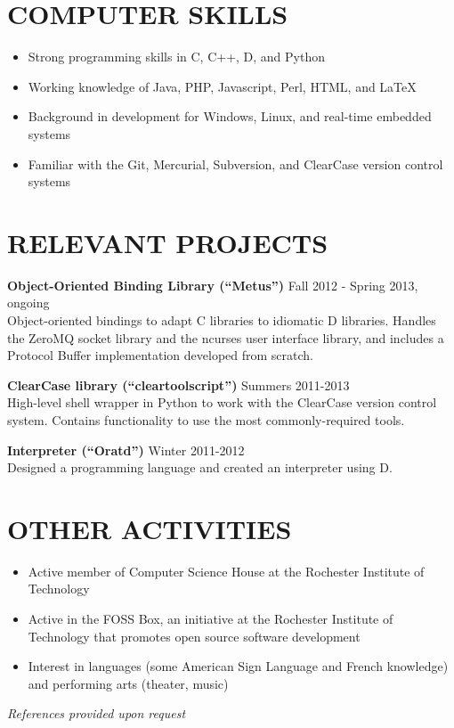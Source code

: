 \documentclass[line]{res}
\begin{document}
\begin{resume}
\section{COMPUTER SKILLS}

	\begin{itemize}[leftmargin=10pt]
	\item Strong programming skills in C, C++, D, and Python
	\item Working knowledge of Java, PHP, Javascript, Perl, HTML, and LaTeX
	\item Background in development for Windows, Linux, and real-time embedded systems
	\item Familiar with the Git, Mercurial, Subversion, and ClearCase version control systems
	\end{itemize}

\section{RELEVANT PROJECTS}

	\textbf{Object-Oriented Binding Library (``Metus'')}
	\hfill
	Fall 2012 - Spring 2013, ongoing
	\\
	Object-oriented bindings to adapt C libraries to idiomatic D libraries. Handles the ZeroMQ  socket library and the ncurses user interface library, and includes a Protocol Buffer implementation developed from scratch.
	
	\textbf{ClearCase library (``cleartoolscript'')}
	\hfill
	Summers 2011-2013
	\\
	High-level shell wrapper in Python to work with the ClearCase version control system. Contains functionality to use the most commonly-required tools.
	
	\textbf{Interpreter (``Oratd'')}
	\hfill
	Winter 2011-2012
	\\
	Designed a programming language and created an interpreter using D.%

\section{OTHER ACTIVITIES}
	\begin{itemize}[leftmargin=10pt]
	\item Active member of Computer Science House at the Rochester Institute of Technology
	\item Active in the FOSS Box, an initiative at the Rochester Institute of Technology that promotes open source software development
	\item Interest in languages (some American Sign Language and French knowledge) and performing arts (theater, music)
	\end{itemize}

\begin{center}
\vspace{-0.26in}\hspace{-0.8in}\emph{References provided upon request\\[8pt]}
\end{center}

\end{resume}
\end{document}
